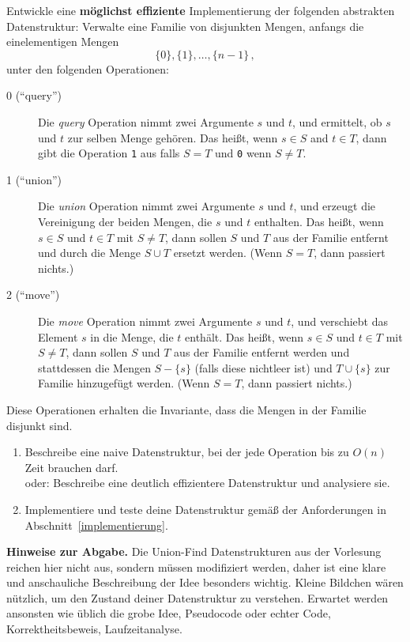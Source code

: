 \documentclass{uebung_cs}
\begin{document}
\begin{aufgabe}
  Entwickle eine \textbf{möglichst effiziente} Implementierung der folgenden abstrakten Datenstruktur:
  Verwalte eine Familie von disjunkten Mengen, anfangs die einelementigen Mengen
  \[ \{0\},\{1\}, \ldots,\{n-1\}\,,\]
  unter den folgenden Operationen:
  \begin{description}
   \item[0 (\enquote{query})]
      Die \emph{query} Operation nimmt zwei Argumente $s$ und $t$, und ermittelt, ob $s$ und $t$ zur selben Menge gehören.
      Das heißt, wenn $s\in S$ and $t\in T$, dann gibt die Operation \texttt{1} aus falls $S=T$ und \texttt{0} wenn $S\neq T$.
    \item[1 (\enquote{union})]
    Die \emph{union} Operation nimmt zwei Argumente $s$ und $t$, und erzeugt die Vereinigung der beiden Mengen, die $s$ und $t$ enthalten.
    Das heißt, wenn $s\in S$ und $t\in T$ mit $S\neq T$, dann sollen $S$ und $T$ aus der Familie entfernt und durch die Menge $S\cup T$ ersetzt werden.
      (Wenn $S=T$, dann passiert nichts.)
    \item[2 (\enquote{move})]
      Die \emph{move} Operation nimmt zwei Argumente $s$ und $t$, und verschiebt das Element $s$ in die Menge, die $t$ enthält.
      Das heißt, wenn $s\in S$ und $t\in T$ mit $S\neq T$, dann sollen $S$ und $T$ aus der Familie entfernt werden und stattdessen die Mengen $S-\{s\}$ (falls diese nichtleer ist)  und $T\cup\{s\}$ zur Familie hinzugefügt werden.
      (Wenn $S= T$, dann passiert nichts.)
  \end{description}
  Diese Operationen erhalten die Invariante, dass die Mengen in der Familie disjunkt sind.
  
  \begin{enumerate}
    \item\label{describe} \bestehen Beschreibe eine naive Datenstruktur, bei der jede Operation bis zu $O(n)$ Zeit brauchen darf.
		\\
		oder: \mittel Beschreibe eine deutlich effizientere Datenstruktur und analysiere sie.
    \item\label{implement} \bestehen Implementiere und teste deine Datenstruktur gemäß der Anforderungen in Abschnitt~\ref{implementierung}.
  \end{enumerate}

  \textbf{Hinweise zur Abgabe.}
  Die Union-Find Datenstrukturen aus der Vorlesung reichen hier nicht aus, sondern müssen modifiziert werden, daher ist eine klare und anschauliche Beschreibung der Idee besonders wichtig. Kleine Bildchen wären nützlich, um den Zustand deiner Datenstruktur zu verstehen.
  Erwartet werden ansonsten wie üblich die grobe Idee, Pseudocode oder echter Code, Korrektheitsbeweis, Laufzeitanalyse.


\end{aufgabe}
\end{document}
